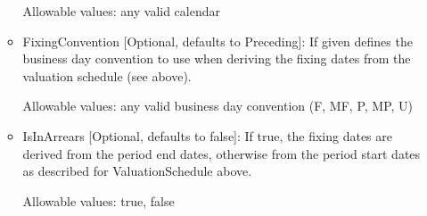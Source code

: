 \begin{itemize}
\begin{itemize}
  Allowable values: any valid calendar

\item FixingConvention [Optional, defaults to Preceding]: If given defines the business day convention to use when
  deriving the fixing dates from the valuation schedule (see above).

  Allowable values: any valid business day convention (F, MF, P, MP, U)

\item IsInArrears [Optional, defaults to false]: If true, the fixing dates are derived from the period end dates,
  otherwise from the period start dates as described for ValuationSchedule above.

  Allowable values: true, false

\end{itemize}

\end{itemize}
